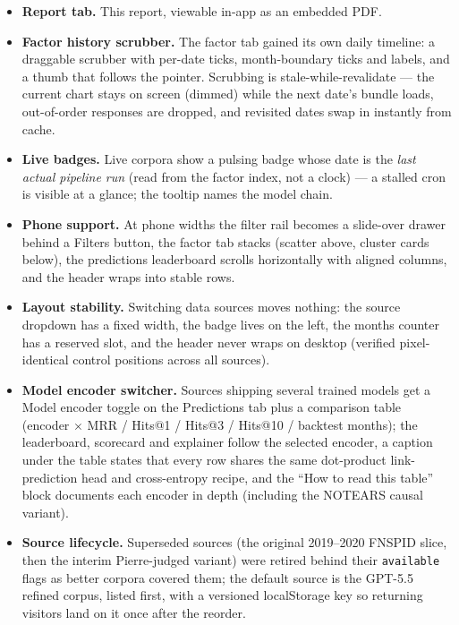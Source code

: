 \documentclass[11pt]{article}
\begin{document}
\begin{itemize}
  \item \textbf{Report tab.} This report, viewable in-app as an embedded PDF.
  \item \textbf{Factor history scrubber.} The factor tab gained its own daily timeline: a draggable scrubber with per-date ticks, month-boundary ticks and labels, and a thumb that follows the pointer. Scrubbing is stale-while-revalidate --- the current chart stays on screen (dimmed) while the next date's bundle loads, out-of-order responses are dropped, and revisited dates swap in instantly from cache.
  \item \textbf{Live badges.} Live corpora show a pulsing badge whose date is the \emph{last actual pipeline run} (read from the factor index, not a clock) --- a stalled cron is visible at a glance; the tooltip names the model chain.
  \item \textbf{Phone support.} At phone widths the filter rail becomes a slide-over drawer behind a Filters button, the factor tab stacks (scatter above, cluster cards below), the predictions leaderboard scrolls horizontally with aligned columns, and the header wraps into stable rows.
  \item \textbf{Layout stability.} Switching data sources moves nothing: the source dropdown has a fixed width, the badge lives on the left, the months counter has a reserved slot, and the header never wraps on desktop (verified pixel-identical control positions across all sources).
  \item \textbf{Model encoder switcher.} Sources shipping several trained models get a Model encoder toggle on the Predictions tab plus a comparison table (encoder \(\times\) MRR / Hits@1 / Hits@3 / Hits@10 / backtest months); the leaderboard, scorecard and explainer follow the selected encoder, a caption under the table states that every row shares the same dot-product link-prediction head and cross-entropy recipe, and the ``How to read this table'' block documents each encoder in depth (including the NOTEARS causal variant).
  \item \textbf{Source lifecycle.} Superseded sources (the original 2019--2020 FNSPID slice, then the interim Pierre-judged variant) were retired behind their \texttt{available} flags as better corpora covered them; the default source is the GPT-5.5 refined corpus, listed first, with a versioned localStorage key so returning visitors land on it once after the reorder.
\end{itemize}
\end{document}
